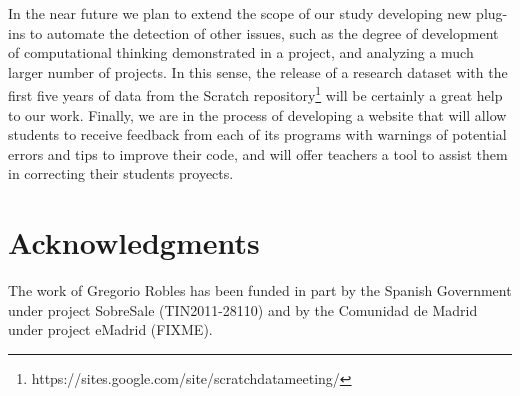 \documentclass[conference]{format/IEEEtran}
\begin{document}

In the near future we plan to extend the scope of our study developing new plug-ins to automate the detection of other issues, such as the degree of development of computational thinking demonstrated in a project, and analyzing a much larger number of projects. In this sense, the release of a research dataset with the first five years of data from the Scratch repository\footnote{https://sites.google.com/site/scratchdatameeting/} will be certainly a great help to our work. Finally, we are in the process of developing a website that will allow students to receive feedback from each of its programs with warnings of potential errors and tips to improve their code, and will offer teachers a tool to assist them in correcting their students proyects.

\section*{Acknowledgments}

The work of Gregorio Robles has
been funded in part by the Spanish Government under project 
SobreSale (TIN2011-28110) and by the Comunidad de Madrid 
under project eMadrid (FIXME). 



\end{document}
